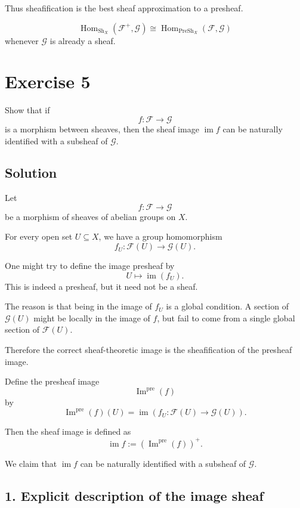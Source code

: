 \documentclass[12pt,a4paper]{article}
\begin{document}
Thus sheafification is the best sheaf approximation to a presheaf.

\[
\boxed{
	\operatorname{Hom}_{\operatorname{Sh}_X}(\mathcal F^+,\mathcal G)
	\cong
	\operatorname{Hom}_{\operatorname{PreSh}_X}(\mathcal F,\mathcal G)
}
\]
whenever $\mathcal G$ is already a sheaf.

\newpage

\section*{Exercise 5}

Show that if
\[
f : \mathcal F \longrightarrow \mathcal G
\]
is a morphism between sheaves, then the sheaf image $\operatorname{im} f$
can be naturally identified with a subsheaf of $\mathcal G$.

\subsection*{Solution}

Let
\[
f : \mathcal F \longrightarrow \mathcal G
\]
be a morphism of sheaves of abelian groups on $X$.

For every open set $U \subseteq X$, we have a group homomorphism
\[
f_U : \mathcal F(U) \longrightarrow \mathcal G(U).
\]

One might try to define the image presheaf by
\[
U \longmapsto \operatorname{im}(f_U).
\]
This is indeed a presheaf, but it need not be a sheaf.

The reason is that being in the image of $f_U$ is a global condition.
A section of $\mathcal G(U)$ might be locally in the image of $f$, but fail to
come from a single global section of $\mathcal F(U)$.

Therefore the correct sheaf-theoretic image is the sheafification of the
presheaf image.

Define the presheaf image
\[
\operatorname{Im}^{\operatorname{pre}}(f)
\]
by
\[
\operatorname{Im}^{\operatorname{pre}}(f)(U)
=
\operatorname{im}
\left(
f_U : \mathcal F(U) \to \mathcal G(U)
\right).
\]

Then the sheaf image is defined as
\[
\operatorname{im} f
:=
\left(\operatorname{Im}^{\operatorname{pre}}(f)\right)^+.
\]

We claim that $\operatorname{im} f$ can be naturally identified with a subsheaf
of $\mathcal G$.

\subsection*{1. Explicit description of the image sheaf}
\end{document}
